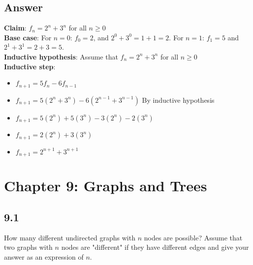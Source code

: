 \documentclass{article}
\begin{document}
\subsection*{Answer}
\textbf{Claim}: $f_n=2^n+3^n$ for all $n\geq0$
\\ \textbf{Base case}: For $n=0$: $f_0=2$, and $2^0+3^0=1+1=2$. For $n=1$: $f_1=5$ and $2^1+3^1=2+3=5$.
\\ \textbf{Inductive hypothesis}: Assume that $f_n=2^n+3^n$ for all $n\geq0$
\\ \textbf{Inductive step}:
\begin{itemize}[label=]
    \item $f_{n+1}=5f_n-6f_{n-1}$
    \item $f_{n+1}=5(2^n+3^n)-6(2^{n-1}+3^{n-1})$ By inductive hypothesis
    \item $f_{n+1}=5(2^n)+5(3^n)-3(2^n)-2(3^n)$
    \item $f_{n+1}=2(2^n)+3(3^n)$
    \item $f_{n+1}=2^{n+1}+3^{n+1}$
\end{itemize}
\newpage
\section*{Chapter 9: Graphs and Trees}
\subsection*{9.1}
How many different undirected graphs with $n$ nodes are possible? Assume that two graphs with $n$ nodes are "different" if they have different edges and give your answer as an expression of $n$.
\newpage
\end{document}
